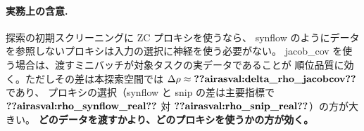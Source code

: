\documentclass[11pt]{article}
\providecommand{\airasval}[1]{\textbf{??airasval:\detokenize{#1}??}}
\begin{document}
\paragraph{実務上の含意.}
探索の初期スクリーニングに ZC プロキシを使うなら、
synflow のようにデータを参照しないプロキシは入力の選択に神経を使う必要がない。
jacob\_cov を使う場合は、渡すミニバッチが対象タスクの実データであることが
順位品質に効く。ただしその差は本探索空間では $\Delta\rho \approx \airasval{delta_rho_jacobcov}$ であり、
プロキシの選択（synflow と snip の差は主要指標で
$\airasval{rho_synflow_real}$ 対 $\airasval{rho_snip_real}$）の方が大きい。
\textbf{どのデータを渡すかより、どのプロキシを使うかの方が効く。}



\end{document}

